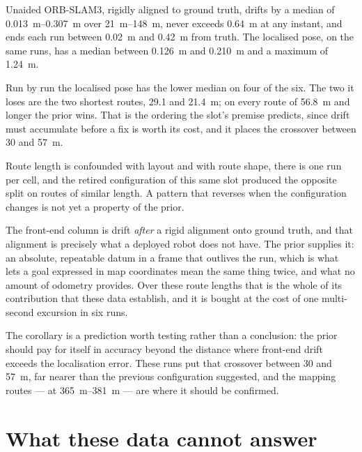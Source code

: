 \documentclass[11pt,a4paper,notitlepage]{report}
\begin{document}
Unaided ORB-SLAM3, rigidly aligned to ground truth, drifts by a median of
\SIrange{0.013}{0.307}{\metre} over \SIrange{21}{148}{\metre}, never exceeds
\SI{0.64}{\metre} at any instant, and ends each run between \SI{0.02}{\metre}
and \SI{0.42}{\metre} from truth. The localised pose, on the same runs, has a
median between \SI{0.126}{\metre} and \SI{0.210}{\metre} and a maximum of
\SI{1.24}{\metre}.

Run by run the localised pose has the lower median on four of the six. The two
it loses are the two shortest routes, \SI{29.1}{} and \SI{21.4}{\metre}; on
every route of \SI{56.8}{\metre} and longer the prior wins. That is the
ordering the slot's premise predicts, since drift must accumulate before a fix
is worth its cost, and it places the crossover between \SI{30}{} and
\SI{57}{\metre}.

 Route length is
confounded with layout and with route shape, there is one run per cell, and the
retired configuration of this same slot produced the opposite split on routes
of similar length. A pattern that reverses when the configuration changes is
not yet a property of the prior.

 The front-end column is drift \emph{after} a rigid alignment onto
ground truth, and that alignment is precisely what a deployed robot does not
have. The prior supplies it: an absolute, repeatable datum in a frame that
outlives the run, which is what lets a goal expressed in map coordinates mean
the same thing twice, and what no amount of odometry provides. Over these route
lengths that is the whole of its contribution that these data establish, and it
is bought at the cost of one multi-second excursion in six runs.

The corollary is a prediction worth testing rather than a conclusion: the prior
should pay for itself in accuracy beyond the distance where front-end drift
exceeds the localisation error. These runs put that crossover between
\SI{30}{} and \SI{57}{\metre}, far nearer than the previous configuration
suggested, and the mapping routes --- at \SIrange{365}{381}{\metre} --- are
where it should be confirmed.

\FloatBarrier
\section{What these data cannot answer}
\end{document}
